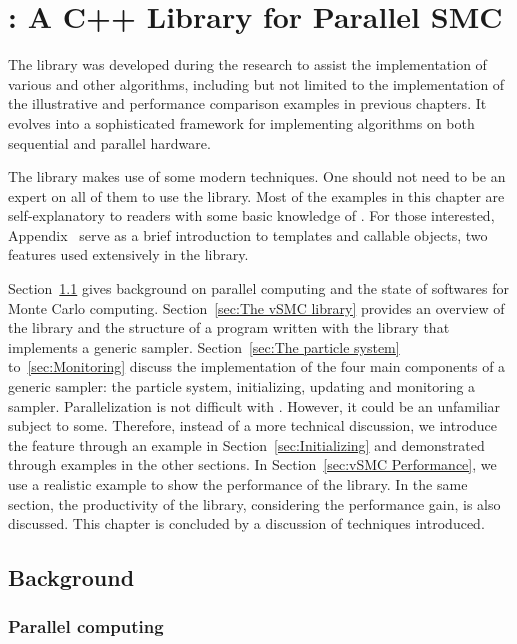 \chapter[vSMC: A C++ Library for Parallel SMC]
{\protect\vsmc: A C++ Library for Parallel SMC}
\label{cha:vSMC: A C++ Library for Parallel SMC}

The \vsmc library was developed during the research to assist the
implementation of various \smc and other algorithms, including but not limited
to the implementation of the illustrative and performance comparison examples
in previous chapters. It evolves into a sophisticated \cpp framework for
implementing \smc algorithms on both sequential and parallel hardware.

The library makes use of some modern \cpp techniques. One should not need to
be an expert on all of them to use the library. Most of the examples in this
chapter are self-explanatory to readers with some basic knowledge of \cpp.
For those interested, Appendix~ serve as a brief
introduction to \cpp templates and callable objects, two features used
extensively in the \vsmc library.

Section~\ref{sec:vSMC Background} gives background on parallel computing and
the state of softwares for Monte Carlo computing. Section~\ref{sec:The vSMC
  library} provides an overview of the library and the structure of a program
written with the library that implements a generic \smc sampler.
Section~\ref{sec:The particle system} to~\ref{sec:Monitoring} discuss the
implementation of the four main components of a generic \smc sampler: the
particle system, initializing, updating and monitoring a sampler.
Parallelization is not difficult with \vsmc. However, it could be an
unfamiliar subject to some. Therefore, instead of a more technical discussion,
we introduce the feature through an example in Section~\ref{sec:Initializing}
and demonstrated through examples in the other sections. In
Section~\ref{sec:vSMC Performance}, we use a realistic example to show the
performance of the library. In the same section, the productivity of the
library, considering the performance gain, is also discussed. This chapter is
concluded by a discussion of techniques introduced.

\section{Background}
\label{sec:vSMC Background}

\subsection{Parallel computing}
\label{sub:Parallel computing}

